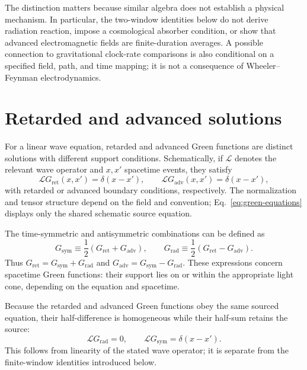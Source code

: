 \documentclass[12pt]{article}
\begin{document}
The distinction matters because similar algebra does not establish a physical mechanism. In particular, the two-window identities below do not derive radiation reaction, impose a cosmological absorber condition, or show that advanced electromagnetic fields are finite-duration averages. A possible connection to gravitational clock-rate comparisons is also conditional on a specified field, path, and time mapping; it is not a consequence of Wheeler--Feynman electrodynamics.

\section{Retarded and advanced solutions}

For a linear wave equation, retarded and advanced Green functions are distinct solutions with different support conditions. Schematically, if $\mathcal{L}$ denotes the relevant wave operator and $x,x'$ spacetime events, they satisfy
\begin{equation}
  \mathcal{L}G_{\mathrm{ret}}(x,x')=\delta(x-x'),
  \qquad
  \mathcal{L}G_{\mathrm{adv}}(x,x')=\delta(x-x'),
  \label{eq:green-equations}
\end{equation}
with retarded or advanced boundary conditions, respectively. The normalization and tensor structure depend on the field and convention; Eq.~\eqref{eq:green-equations} displays only the shared schematic source equation.

The time-symmetric and antisymmetric combinations can be defined as
\begin{equation}
  G_{\mathrm{sym}}\equiv\frac{1}{2}
  \left(G_{\mathrm{ret}}+G_{\mathrm{adv}}\right),
  \qquad
  G_{\mathrm{rad}}\equiv\frac{1}{2}
  \left(G_{\mathrm{ret}}-G_{\mathrm{adv}}\right).
  \label{eq:green-split}
\end{equation}
Thus $G_{\mathrm{ret}}=G_{\mathrm{sym}}+G_{\mathrm{rad}}$ and $G_{\mathrm{adv}}=G_{\mathrm{sym}}-G_{\mathrm{rad}}$. These expressions concern spacetime Green functions: their support lies on or within the appropriate light cone, depending on the equation and spacetime.

Because the retarded and advanced Green functions obey the same sourced equation, their half-difference is homogeneous while their half-sum retains the source:
\begin{equation}
  \mathcal{L}G_{\mathrm{rad}}=0,
  \qquad
  \mathcal{L}G_{\mathrm{sym}}=\delta(x-x').
  \label{eq:green-split-equations}
\end{equation}
This follows from linearity of the stated wave operator; it is separate from the finite-window identities introduced below.
\end{document}
